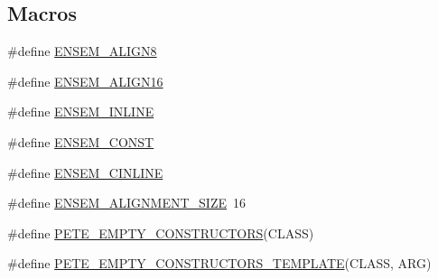 \subsection*{Macros}
\begin{DoxyCompactItemize}
\item 
\#define \mbox{\hyperlink{adat-devel_2lib_2ensem_2ensem_8h_a42b8b80d59d026314dcec0b090273d49}{E\+N\+S\+E\+M\+\_\+\+A\+L\+I\+G\+N8}}
\item 
\#define \mbox{\hyperlink{adat-devel_2lib_2ensem_2ensem_8h_a13e73f6d219980e649589b0ce3f31984}{E\+N\+S\+E\+M\+\_\+\+A\+L\+I\+G\+N16}}
\item 
\#define \mbox{\hyperlink{adat-devel_2lib_2ensem_2ensem_8h_aa5201403fe8be88967b018862bee8657}{E\+N\+S\+E\+M\+\_\+\+I\+N\+L\+I\+NE}}
\item 
\#define \mbox{\hyperlink{adat-devel_2lib_2ensem_2ensem_8h_af995ed3857359aae4ed4dc23dfb487aa}{E\+N\+S\+E\+M\+\_\+\+C\+O\+N\+ST}}
\item 
\#define \mbox{\hyperlink{adat-devel_2lib_2ensem_2ensem_8h_ae7dca35e469c04f5f86bc3694b771069}{E\+N\+S\+E\+M\+\_\+\+C\+I\+N\+L\+I\+NE}}
\item 
\#define \mbox{\hyperlink{adat-devel_2lib_2ensem_2ensem_8h_ac682d27b20fe2f2027eb00d506be4813}{E\+N\+S\+E\+M\+\_\+\+A\+L\+I\+G\+N\+M\+E\+N\+T\+\_\+\+S\+I\+ZE}}~16
\item 
\#define \mbox{\hyperlink{adat-devel_2lib_2ensem_2ensem_8h_a97ea3a1d467b65f448446ba3046ddd00}{P\+E\+T\+E\+\_\+\+E\+M\+P\+T\+Y\+\_\+\+C\+O\+N\+S\+T\+R\+U\+C\+T\+O\+RS}}(C\+L\+A\+SS)
\item 
\#define \mbox{\hyperlink{adat-devel_2lib_2ensem_2ensem_8h_af2f0cc2144f5bf18803b56edbfa78c41}{P\+E\+T\+E\+\_\+\+E\+M\+P\+T\+Y\+\_\+\+C\+O\+N\+S\+T\+R\+U\+C\+T\+O\+R\+S\+\_\+\+T\+E\+M\+P\+L\+A\+TE}}(C\+L\+A\+SS,  A\+RG)
\end{DoxyCompactItemize}
